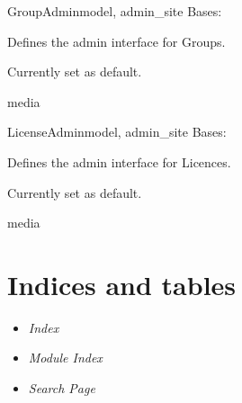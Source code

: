 \documentclass[letterpaper,10pt,english]{sphinxmanual}
\begin{document}
\hypertarget{groups.admin.GroupAdmin}{}\begin{classdesc}{GroupAdmin}{model, admin\_site}
Bases: 

Defines the admin interface for Groups.

Currently set as default.

\hypertarget{groups.admin.GroupAdmin.media}{}\begin{memberdesc}{media}\end{memberdesc}
\end{classdesc}

\hypertarget{groups.admin.LicenseAdmin}{}\begin{classdesc}{LicenseAdmin}{model, admin\_site}
Bases: 

Defines the admin interface for Licences.

Currently set as default.

\hypertarget{groups.admin.LicenseAdmin.media}{}\begin{memberdesc}{media}\end{memberdesc}
\end{classdesc}


\chapter{Indices and tables}
\begin{itemize}
\item {} 
\emph{Index}

\item {} 
\emph{Module Index}

\item {} 
\emph{Search Page}

\end{itemize}


\renewcommand{\indexname}{Module Index}
\printmodindex
\renewcommand{\indexname}{Index}
\printindex
\end{document}
